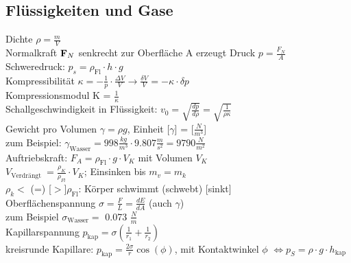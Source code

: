 \documentclass[fs, footer]{latex4ei}
\begin{document}
\begin{multicols*}{4}

\subsection{Flüssigkeiten und Gase}
Dichte $\rho = \frac{m}{V}$\\
Normalkraft $\textbf{F}_N$ senkrecht zur Oberfläche A erzeugt Druck $p = \frac{F_N}{A}$\\
Schweredruck: $p_s = \rho_{\text{Fl}}\cdot h\cdot g$\\
Kompressibilität $\kappa = -\frac{1}{p}\cdot \frac{\Delta V}{V} \rightarrow \frac{\delta V}{V}=-\kappa\cdot \delta p$\\
Kompressionsmodul K = $\frac{1}{\kappa}$\\
Schallgeschwindigkeit in Flüssigkeit: $v_0 = \sqrt{\frac{dp}{d\rho}} = \sqrt{\frac{1}{\rho\kappa}}$\\
Gewicht pro Volumen $\gamma = \rho g$, Einheit [$\gamma$] = [$\frac{N}{m^3}$]\\ zum Beispiel: $\gamma_{\text{Wasser}} = 998\frac{kg}{m^3}\cdot 9.807\frac{m}{s^2} = 9790 \frac{N}{m^2}$\\
Auftriebskraft: $F_A = \rho_{\text{Fl}}\cdot g\cdot V_K$ mit Volumen $V_K$\\
$V_{\text{Verdrängt }} = \frac{\rho_K}{\rho_{Fl}}\cdot V_K$; Einsinken bis $m_v = m_k$\\
$\rho_k < $ (=) [$>$]$ \rho_{\text{Fl}}$: Körper schwimmt (schwebt) [sinkt]\\ %
Oberflächenspannung $\sigma = \frac{F}{L} = \frac{dE}{dA}$ (auch $\gamma$)\\
zum Beispiel $\sigma_{\text{Wasser}} =$ 0.073 $\frac{N}{m}$\\
Kapillarspannung $p_{\text{kap}} = \sigma(\frac{1}{r_1}+\frac{1}{r_2})$\\
kreisrunde Kapillare: $p_{\text{kap}} = \frac{2\sigma}{r}\cos (\phi)$, mit Kontaktwinkel $\phi$ $\Leftrightarrow p_S = \rho\cdot g\cdot h_{\text{kap}}$\\

\end{multicols*}
\end{document}
